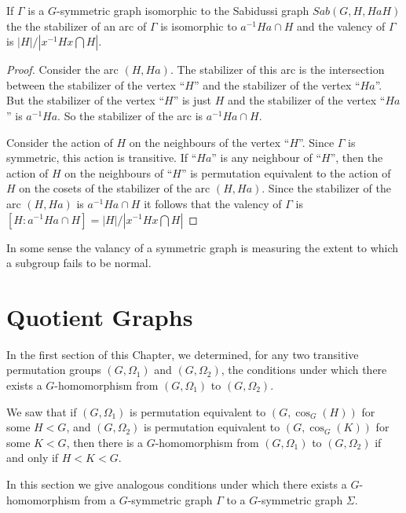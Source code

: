 \begin{proposition}
If $\Gamma$ is a $G$-symmetric graph isomorphic to the Sabidussi
graph $Sab(G,H,HaH)$ the the stabilizer of an arc of $\Gamma$
is isomorphic to $a^{-1}Ha \cap H$ and the valency of $\Gamma$
is $ |H|/|x^{-1}Hx \bigcap H| $.
\begin{proof}
Consider the arc $(H,Ha)$. The stabilizer of this arc is
the intersection between the stabilizer of the vertex ``$H$''
and the stabilizer of the vertex ``$Ha$''.
But the stabilizer of the vertex ``$H$'' is just $H$
and the stabilizer of the vertex ``$Ha$'' is $a^{-1}Ha$.
So the stabilizer of the arc is $a^{-1}Ha \cap H$.

Consider the action of $H$ on the neighbours 
of the vertex ``$H$''.
Since $\Gamma$ is symmetric, this action is transitive.
If ``$Ha$'' is any neighbour of ``$H$'',
then the action of $H$ on the neighbours of ``$H$''
is permutation equivalent to the action of $H$
on the cosets of the stabilizer of the arc $(H,Ha)$.
Since the stabilizer of the arc $(H,Ha)$ is $a^{-1}Ha \cap H$
it follows that the valency of $\Gamma$ is
$[H : a^{-1}Ha \cap H] = |H|/|x^{-1}Hx \bigcap H|$

\end{proof}

\end{proposition}

In some sense the valancy of a symmetric graph is
measuring the extent to which a subgroup fails to be normal.


\section{Quotient Graphs}

In the first section of this Chapter,
we determined, for any two transitive permutation groups
$(G, \Omega_1)$ and $(G,\Omega_2)$, 
the conditions under which there exists a
$G$-homomorphism from $(G,\Omega_1)$ to $(G,\Omega_2)$.

We saw that if $(G,\Omega_1)$
is permutation equivalent to $(G,\cos_G(H))$ 
for some $H < G$,
and $(G,\Omega_2)$ is permutation equivalent
to $(G,\cos_G(K))$ for some $K < G$,
then there is a $G$-homomorphism from $(G,\Omega_1)$
to $(G,\Omega_2)$ if and only if $H < K < G$.

In this section we give analogous conditions
under which there exists a $G$-homomorphism
from a $G$-symmetric graph $\Gamma$
to a $G$-symmetric graph $\Sigma$.

